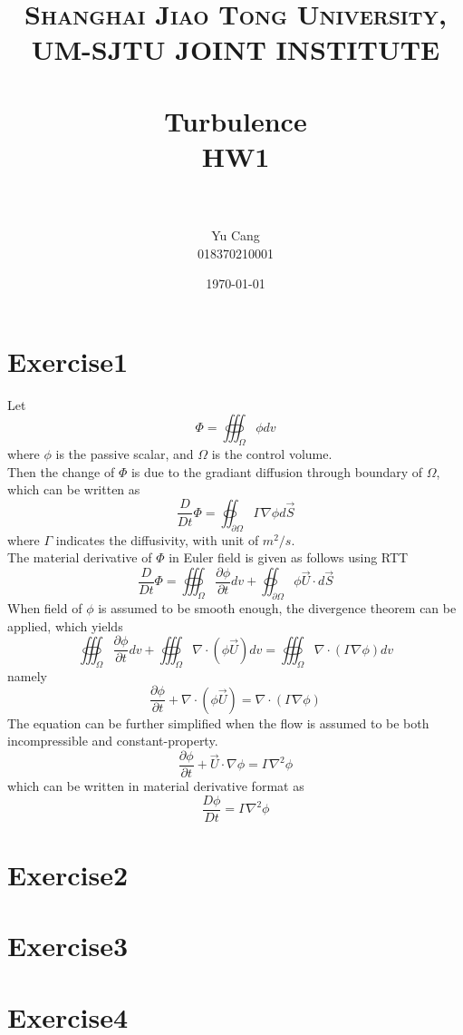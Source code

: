 \documentclass[paper=a4, fontsize=11pt]{scrartcl} %
\title{	
\normalfont \normalsize 
\textsc{Shanghai Jiao Tong University, UM-SJTU JOINT INSTITUTE} \\ [25pt] %
\horrule{0.5pt} \\[0.4cm] %
\huge Turbulence \\ HW1 \\ %
\horrule{2pt} \\[0.5cm] %
}
\author{Yu Cang \\ 018370210001} %
\date{\normalsize \today} %
\numberwithin{equation}{section} %
\numberwithin{figure}{section} %
\numberwithin{table}{section} %
\begin{document}
\maketitle %

\section{Exercise1}
  Let
  \begin{equation}
  	\Phi = \oiiint_\Omega \phi dv
  \end{equation}
  where $\phi$ is the passive scalar, and $\Omega$ is the control volume. \\
  Then the change of $\Phi$ is due to the gradiant diffusion through boundary of $\Omega$, which can be written as
  \begin{equation}
  	\frac{D}{Dt} \Phi = \oiint_{\partial \Omega} \Gamma \nabla \phi d\vec{S}
  \end{equation}
  where $\Gamma$ indicates the diffusivity, with unit of $m^2/s$.\\
  The material derivative of $\Phi$ in Euler field is given as follows using RTT
  \begin{equation}
  	\frac{D}{Dt} \Phi = \oiiint_\Omega \frac{\partial \phi}{\partial t} dv + \oiint_{\partial \Omega} \phi \vec{U} \cdot d\vec{S}
  \end{equation}
  When field of $\phi$ is assumed to be smooth enough, the divergence theorem can be applied, which yields
  \begin{equation}
  	\oiiint_\Omega \frac{\partial \phi}{\partial t} dv + \oiiint_\Omega \nabla \cdot (\phi \vec{U}) dv = \oiiint_\Omega \nabla \cdot (\Gamma \nabla \phi) dv
  \end{equation}
  namely
  \begin{equation}
  	\frac{\partial \phi}{\partial t} + \nabla \cdot (\phi \vec{U}) = \nabla \cdot (\Gamma \nabla \phi)
  \end{equation}
  The equation can be further simplified when the flow is assumed to be both incompressible and constant-property.
  \begin{equation}
  		\frac{\partial \phi}{\partial t} + \vec{U} \cdot \nabla \phi = \Gamma \nabla^2 \phi
  \end{equation}
  which can be written in material derivative format as
  \begin{equation}
  	\frac{D\phi}{Dt} = \Gamma \nabla^2 \phi
  \end{equation}
  
\section{Exercise2}

\section{Exercise3}

\section{Exercise4}
\end{document}
